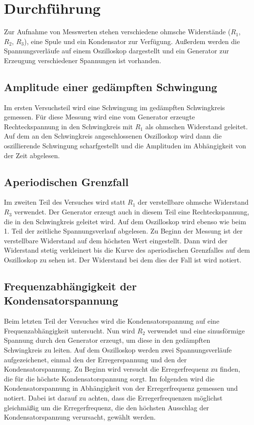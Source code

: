 \section{Durchführung}
\label{sec:Durchführung}
Zur Aufnahme von Messwerten stehen verschiedene ohmsche Widerstände ($R_1$, $R_2$, $R_3$),
 eine Spule und ein Kondensator zur Verfügung. Außerdem werden die Spannungsverläufe 
 auf einem Oszilloskop dargestellt und ein Generator zur Erzeugung verschiedener 
 Spannungen ist vorhanden. 
\subsection{Amplitude einer gedämpften Schwingung}
Im ersten Versuchsteil wird eine Schwingung im gedämpften Schwingkreis gemessen. Für
diese Messung wird eine vom Generator erzeugte Rechteckspannung in den Schwingkreis 
mit $R_1$ als ohmschen Widerstand geleitet. Auf dem an den Schwingkreis angeschlossenen
Oszilloskop wird dann die oszillierende Schwingung scharfgestellt und die 
Amplituden im Abhängigkeit von der Zeit abgelesen. 
\subsection{Aperiodischen Grenzfall}
Im zweiten Teil des Versuches wird statt $R_1$ der verstellbare ohmsche Widerstand $R_3$
verwendet. Der Generator erzeugt auch in diesem Teil eine Rechteckspannung, die in den 
Schwingkreis geleitet wird. Auf dem Oszilloskop wird ebenso wie beim 1. Teil der zeitliche
Spannungsverlauf abgelesen. Zu Beginn der Messung ist der verstellbare Widerstand auf 
dem höchsten Wert eingestellt. Dann wird der Widerstand stetig verkleinert bis die Kurve
des aperiodischen Grenzfalles auf dem Oszilloskop zu sehen ist. Der Widerstand bei dem 
dies der Fall ist wird notiert. 
\subsection{Frequenzabhängigkeit der Kondensatorspannung}
Beim letzten Teil der Versuches wird die Kondensatorspannung auf eine Frequenzabhängigkeit 
untersucht. Nun wird $R_2$ verwendet und eine sinusförmige Spannung durch den Generator
erzeugt, um diese in den gedämpften Schwingkreis zu leiten. Auf dem Oszilloskop werden
zwei Spannungsverläufe aufgezeichenet, einmal den der Erregerspannung und den der 
Kondensatorspannung. Zu Beginn wird versucht die Erregerfrequenz zu finden, die für die 
höchste Kondensatorspannung sorgt. Im folgenden wird die Kondensatorspannung 
in Abhängigkeit von der Erregerfrequenz gemessen und notiert. Dabei ist darauf zu achten, 
dass die Erregerfrequenzen möglichst gleichmäßig um die Erregerfrequenz, die den 
höchsten Ausschlag der Kondensatorspannung verursacht, gewählt werden. 